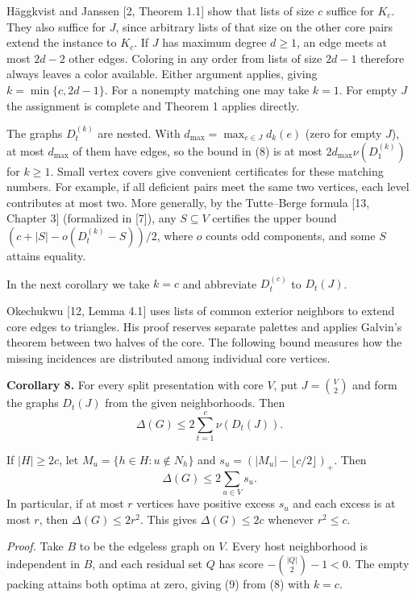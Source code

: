 \documentclass[english,11pt,a4paper]{article}
\newcounter{none}
\begin{document}
Häggkvist and Janssen {[}2, Theorem 1.1{]} show that lists of size \(c\) suffice for \(K_c\). They also suffice for \(J\), since arbitrary lists of that size on the other core pairs extend the instance to \(K_c\). If \(J\) has maximum degree \(d\ge1\), an edge meets at most \(2d-2\) other edges. Coloring in any order from lists of size \(2d-1\) therefore always leaves a color available. Either argument applies, giving \(k=\min\{c,2d-1\}\). For a nonempty matching one may take \(k=1\). For empty \(J\) the assignment is complete and Theorem 1 applies directly.

The graphs \(D_t^{(k)}\) are nested. With \(d_{\max}=\max_{e\in J}d_k(e)\) (zero for empty \(J\)), at most \(d_{\max}\) of them have edges, so the bound in (8) is at most \(2d_{\max}\nu(D_1^{(k)})\) for \(k\ge1\). Small vertex covers give convenient certificates for these matching numbers. For example, if all deficient pairs meet the same two vertices, each level contributes at most two. More generally, by the Tutte--Berge formula {[}13, Chapter 3{]} (formalized in {[}7{]}), any \(S\subseteq V\) certifies the upper bound \((c+|S|-o(D_t^{(k)}-S))/2\), where \(o\) counts odd components, and some \(S\) attains equality.

In the next corollary we take \(k=c\) and abbreviate \(D_t^{(c)}\) to \(D_t(J)\).

Okechukwu {[}12, Lemma 4.1{]} uses lists of common exterior neighbors to extend core edges to triangles. His proof reserves separate palettes and applies Galvin's theorem between two halves of the core. The following bound measures how the missing incidences are distributed among individual core vertices.

\textbf{Corollary 8.} For every split presentation with core \(V\), put \(J=\binom{V}{2}\) and form the graphs \(D_t(J)\) from the given neighborhoods. Then
\[
\Delta(G)\le 2\sum_{t=1}^{c}\nu(D_t(J)). \tag{9}
\]

If \(|H|\ge2c\), let \(M_u=\{h\in H:u\notin N_h\}\) and \(s_u=(|M_u|-\lfloor c/2\rfloor)_+\). Then \[
\Delta(G)\le 2\sum_{u\in V}s_u. \tag{10}
\] In particular, if at most \(r\) vertices have positive excess \(s_u\) and each excess is at most \(r\), then \(\Delta(G)\le2r^2\). This gives \(\Delta(G)\le2c\) whenever \(r^2\le c\).

\emph{Proof.} Take \(B\) to be the edgeless graph on \(V\). Every host neighborhood is independent in \(B\), and each residual set \(Q\) has score \(-\binom{|Q|}{2}-1<0\). The empty packing attains both optima at zero, giving (9) from (8) with \(k=c\).
\end{document}
